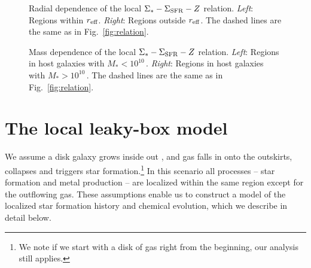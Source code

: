 \documentclass[12pt, appendixfloats, numberedappendix]{emulateapj}
\begin{document}

\begin{figure*}
\caption{Radial dependence of the local $\Sigma_{*}-\Sigma_{\rm SFR}-Z$ relation. \textit{Left}: Regions within $r_{\rm eff}$. \textit{Right}: Regions outside $r_{\rm eff}$. The dashed lines are the same as in Fig.~\ref{fig:relation}.
}
\vspace{0.2cm}
\label{fig:radialdependence}
\end{figure*}


\begin{figure*}
\caption{Mass dependence of the local $\Sigma_{*}-\Sigma_{\rm SFR}-Z$ relation. \textit{Left}: Regions in host galaxies with $M_*<10^{10}\,$\MSun. \textit{Right}: Regions in host galaxies with $M_*>10^{10}\,$\MSun. The dashed lines are the same as in Fig.~\ref{fig:relation}.
}
\vspace{0.2cm}
\label{fig:massdependence}
\end{figure*}

\section{The local leaky-box model}\label{sec:leakymodel}


We assume a disk galaxy grows inside out \citep[\eg][among others]{larson76a, matteucci89a, governato07a, pilkington12a, gibson13a},
and gas falls in onto the outskirts, collapses and triggers star formation.\footnote{We note if we start with a disk of gas right from the beginning, our analysis still applies.}
In this scenario all processes -- star formation and metal production -- are localized within the same region except for the outflowing gas.
These assumptions enable us to construct a model of the localized star formation history
and chemical evolution, which we describe in detail below.
\end{document}
